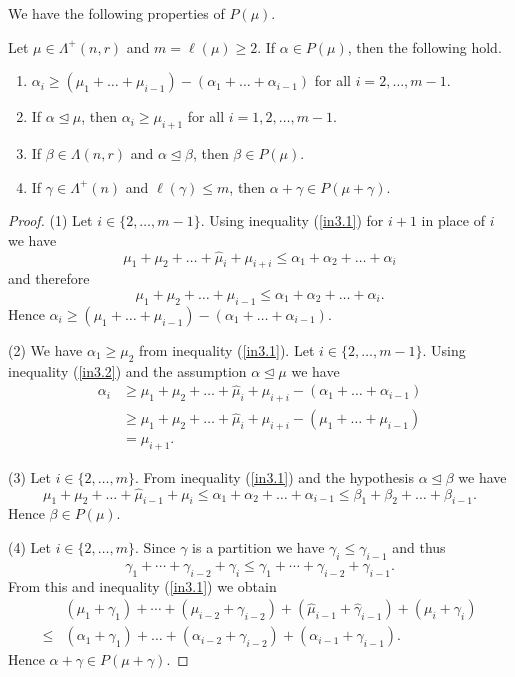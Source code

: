\documentclass[ALCO,Unicode]{cedram}
\newcommand{\al}{\alpha}
\newcommand{\La}{\Lambda}
\numberwithin{equation}{section}
\begin{document}
We have the following properties of $P(\mu)$.	
	\begin{lemma}\label{rem11}Let $\mu\in \La^+(n,r)$ and $m=\ell(\mu) \ge 2$. If $\al \in P(\mu)$, then the following hold. \begin{enumerate} \item $\alpha_{i} \ge (\mu_1+\dots+\mu_{i-1})-(\alpha_1 +\dots+\alpha_{i-1})$ for all $i=2,\dots,m-1$. \item If $\al \unlhd \mu$, then $\alpha_i \ge \mu_{i+1}$ for all $i=1,2,\dots,m-1$.  \item If $\beta \in \La(n,r)$ and $\al \unlhd \beta$, then $\beta \in P(\mu)$. \item If $\gamma \in \Lambda^+(n)$ and $\ell(\gamma) \le m$, then $\alpha+\gamma \in P(\mu +\gamma)$.\end{enumerate} \end{lemma}
	\begin{proof}
		(1) Let $ i \in \{2, \dots, m-1\}$. Using inequality (\ref{in3.1}) for $i+1$ in place of $i$ we have \begin{equation}\label{in3.2}\mu_1 +\mu_2 + \dots +\widehat{\mu}_{i}+\mu_{i+i} \le \al_1+\al_2+\dots+\al_{i}\end{equation} and therefore
		\[\mu_1 +\mu_2 + \dots +\mu_{i-1} \le \al_1+\al_2+\dots+\al_{i}.\] Hence  
	$\alpha_{i} \ge (\mu_1+\dots+\mu_{i-1})-(\alpha_1 +\dots+\alpha_{i-1})$.
	
	(2)	We have $\alpha_1 \ge \mu_2$ from inequality (\ref{in3.1}). Let $ i \in \{2, \dots, m-1\}$. Using inequality (\ref{in3.2}) and the assumption $\al \unlhd \mu$ we have \begin{align*}
		\alpha_i &\ge \mu_1 +\mu_2 + \dots +\widehat{\mu}_{i}+\mu_{i+i} -(\alpha_1 +\dots+\alpha_{i-1})\\ &\ge \mu_1 +\mu_2 + \dots +\widehat{\mu}_{i}+\mu_{i+i} -(\mu_1 +\dots+\mu_{i-1})\\&=\mu_{i+1}.
	\end{align*}
	
	(3) Let $ i \in \{2, \dots, m\}$. From inequality (\ref{in3.1}) and the hypothesis $\al \unlhd \beta$ we have \[ \mu_1 +\mu_2 + \dots +\widehat{\mu}_{i-1}+\mu_{i} \le \al_1+\al_2+\dots+\al_{i-1} \le \beta_1+\beta_2+\dots+\beta_{i-1}.\] Hence $\beta \in P(\mu)$.
	
	(4) Let $ i \in \{2, \dots, m\}$. Since $\gamma$ is a partition we have $\gamma_i \le \gamma_{i-1}$ and thus \[\gamma_1+\cdots +\gamma_{i-2} + \gamma_i \le \gamma_1+ \cdots +\gamma_{i-2} +\gamma_{i-1}. \] From this and inequality (\ref{in3.1}) we obtain
	 \begin{align*}
		&(\mu_1+\gamma_1)+\cdots +(\mu_{i-2}+\gamma_{i-2})+ (\widehat{\mu}_{i-1}+\widehat{\gamma}_{i-1})+(\mu_{i} + \gamma_i) \\ \le& (\alpha_1 + \gamma_1) +\dots+ (\alpha_{i-2}+\gamma_{i-2}) + (\al_{i-1}+\gamma_{i-1}).
	\end{align*}
	Hence $\alpha + \gamma \in P(\mu +\gamma)$.\end{proof}
\end{document}
